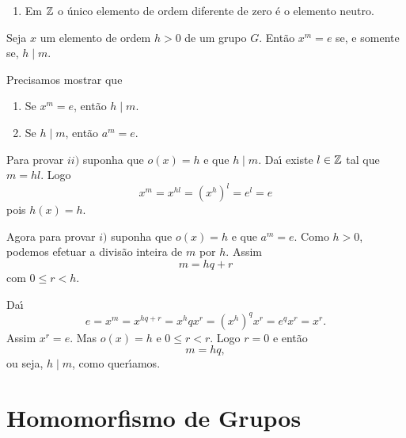 \begin{exemplos}
\begin{enumerate}[label={\arabic*})]
\begin{itemize}
            De modo semelhante chega-se \`a conclus\~ao que
            \[
                o(\overline{2}) = o(\overline{3}) = o(\overline{4}) = 5.
            \]
        \end{itemize}

        \item Em $\mathbb{Z}$ o \'unico elemento de ordem diferente de zero \'e o elemento neutro.
    \end{enumerate}
\end{exemplos}

\begin{proposicao}
    Seja $x$ um elemento de ordem $h > 0$ de um grupo $G$. Ent\~ao $x^m = e$ se, e somente se, $h \mid m$.
\end{proposicao}
\begin{prova}
    Precisamos mostrar que
    \begin{enumerate}[label={\roman*})]
        \item Se $x^m = e$, ent\~ao $h \mid m$.

        \item Se $h \mid m$, ent\~ao $a^m = e$.
    \end{enumerate}

    Para provar $ii)$ suponha que $o(x) = h$ e que $h \mid m$. Da{\'\i} existe $l \in \mathbb{Z}$ tal que $m = hl$. Logo
    \[
        x^m = x^{hl} = (x^h)^l = e^l = e
    \]
    pois $h(x) = h$.

    Agora para provar $i)$ suponha que $o(x) = h$ e que $a^m = e$. Como $h > 0$, podemos efetuar a divis\~ao inteira de $m$ por $h$. Assim
    \[
        m = hq + r
    \]
    com $0 \le r < h$.

    Da{\'\i}
    \[
        e = x^m = x^{hq + r} = x^hqx^r = (x^h)^qx^r = e^qx^r = x^r.
    \]
    Assim $x^r = e$. Mas $o(x) = h$ e $0 \le r < r$. Logo $r = 0$ e ent\~ao
    \[
        m = hq,
    \]
    ou seja, $h \mid m$, como quer{\'\i}amos.
\end{prova}

\section{Homomorfismo de Grupos} %
\label{sec:homomorfismo_de_grupos}


